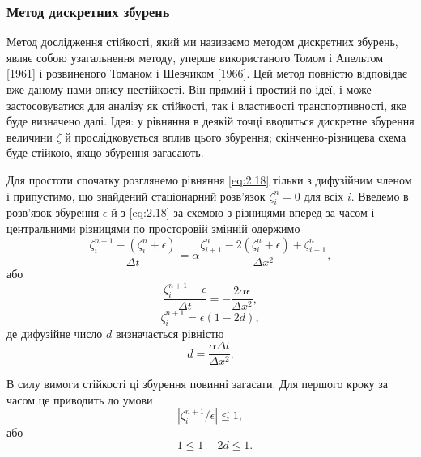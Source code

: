 \subsubsection{Метод дискретних збурень}

Метод дослідження стійкості, який ми називаємо методом дискретних збурень, являє собою узагальнення методу, уперше використаного Томом і Апельтом [1961] і розвиненого Томаном і Шевчиком [1966]. Цей метод повністю відповідає вже даному нами опису нестійкості. Він прямий і простий по ідеї, і може застосовуватися для аналізу як стійкості, так і властивості транспортивності, яке буде визначено далі. Ідея: у рівняння в деякій точці вводиться дискретне збурення величини $\zeta$ й прослідковується вплив цього збурення; скінченно-різницева схема буде стійкою, якщо збурення загасають. \medskip

Для простоти спочатку розглянемо рівняння \eqref{eq:2.18} тільки з дифузійним членом і припустимо, що знайдений стаціонарний розв'язок $\zeta_i^n = 0$ для всіх $i$. Введемо в розв'язок збурення $\epsilon$ й з \eqref{eq:2.18} за схемою з різницями вперед за часом і центральними різницями по просторовій змінній одержимо
\begin{equation}
    \label{eq:5.57}
    \frac{\zeta_i^{n + 1} - (\zeta_i^n + \epsilon)}{\Delta t} = \alpha \frac{\zeta_{i + 1}^n - 2(\zeta_i^n + \epsilon) + \zeta_{i - 1}^n}{\Delta x^2},
\end{equation}
або
\begin{equation}
    \label{eq:5.58}
    \frac{\zeta_i^{n + 1} - \epsilon}{\Delta t} = - \frac{2 \alpha \epsilon}{\Delta x^2},
\end{equation}
\begin{equation}
    \label{eq:5.59}
    \zeta_i^{n + 1} = \epsilon (1 - 2 d),
\end{equation}
де дифузійне число $d$ визначається рівністю
\begin{equation}
    \label{eq:5.60}
    d = \frac{\alpha \Delta t}{\Delta x^2}.
\end{equation}

В силу вимоги стійкості ці збурення повинні загасати. Для першого кроку за часом це приводить до умови
\begin{equation}
    \label{eq:5.61}
    |\zeta_i^{n + 1} / \epsilon | \le 1,
\end{equation}
або
\begin{equation}
    \label{eq:5.62}
    -1 \le 1 - 2 d \le 1.
\end{equation}


